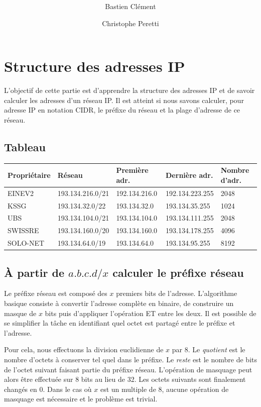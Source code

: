 \documentclass[11pt,a4paper]{article}
\author{Bastien Clément \and Christophe Peretti}
\title{{\normalsize \doccourse} \\ \doctitle }
\begin{document}
\maketitle
\vspace{1em}

\section{Structure des adresses IP}

L'objectif de cette partie est d'apprendre la structure des adresses IP et de savoir calculer les adresses d'un réseau IP. Il est atteint si nous savons calculer, pour adresse IP en notation CIDR, le préfixe du réseau et la plage d'adresse de ce réseau.

\subsection{Tableau}

\begin{tabular}{|l|l|l|l|l|}
	\hline	
	\textbf{Propriétaire} & \textbf{Réseau} & \textbf{Première adr.} & \textbf{Dernière adr.} & \textbf{Nombre d'adr.} \\
	\hline
	EINEV2 & 193.134.216.0/21 & 192.134.216.0 & 192.134.223.255 & 2048 \\
	KSSG & 193.134.32.0/22 & 193.134.32.0 & 193.134.35.255 & 1024 \\
	UBS & 193.134.104.0/21 & 193.134.104.0 & 193.134.111.255 & 2048 \\
	SWISSRE & 193.134.160.0/20 & 193.134.160.0 & 193.134.178.255 & 4096 \\
	SOLO-NET & 193.134.64.0/19 & 193.134.64.0 & 193.134.95.255 & 8192 \\
	\hline
\end{tabular}

\subsection{À partir de $a.b.c.d/x$ calculer le préfixe réseau}

Le préfixe réseau est composé des $x$ premiers bits de l'adresse. L'algorithme basique consiste à convertir l'adresse complète en binaire, de construire un masque de $x$ bits puis d'appliquer l'opération ET entre les deux. Il est possible de se simplifier la tâche en identifiant quel octet est partagé entre le préfixe et l'adresse.

Pour cela, nous effectuons la division euclidienne de $x$ par 8. Le \textit{quotient} est le nombre d'octets à conserver tel quel dans le préfixe. Le \textit{reste} est le nombre de bits de l'octet suivant faisant partie du préfixe réseau. L'opération de masquage peut alors être effectuée sur 8 bits au lieu de 32. Les octets suivants sont finalement changés en 0. 
Dans le cas où $x$ est un multiple de 8, aucune opération de masquage est nécessaire et le problème est trivial.
\end{document}

